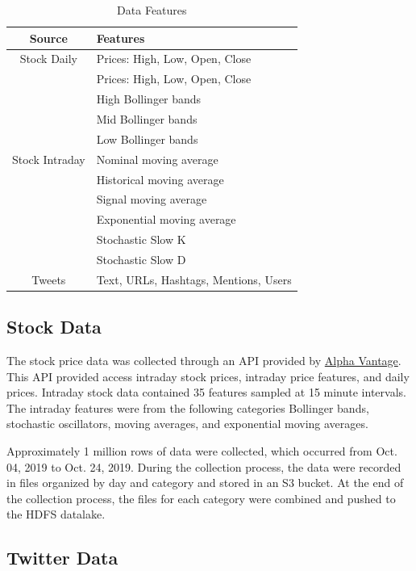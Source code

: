 \documentclass[journal]{IEEEtran}
\begin{document}
\begin{table}
	\renewcommand{\arraystretch}{1.3}
	\caption{Data Features}
	\label{DataFeatures}
	\centering
	\begin{tabular}{c|l}
		\hline
		Source       & Features\\
		\hline
		\hline
		Stock Daily  & Prices: High, Low, Open, Close\\
		\hline
		\multirow{9}{*}{Stock Intraday} &  Prices: High, Low, Open, Close \\
		&  High Bollinger bands\\
		&  Mid Bollinger bands\\
		&  Low Bollinger bands\\ 
		&  Nominal moving average\\
		&  Historical moving average\\
		&  Signal moving average\\ 
		&  Exponential moving average\\
		&  Stochastic Slow K\\
		&  Stochastic Slow D\\
		\hline
		Tweets       & Text, URLs, Hashtags, Mentions, Users\\
		\hline
	\end{tabular}
\end{table}

\subsection{Stock Data}

The stock price data was collected through an API provided by \href{https://www.alphavantage.co/}{Alpha Vantage}.
This API provided access intraday stock prices, intraday price features, and daily prices.
Intraday stock data contained 35 features sampled at 15 minute intervals. 
The intraday features were from the following categories Bollinger bands, stochastic oscillators, moving averages, and exponential moving averages.

Approximately 1 million rows of data were collected,
which occurred from Oct. 04, 2019 to Oct. 24, 2019.
During the collection process, the data were recorded in files
 organized by day and category and stored in an S3 bucket.
At the end of the collection process, the files for each
 category were combined and pushed to the HDFS datalake.


\subsection{Twitter Data}
\end{document}
